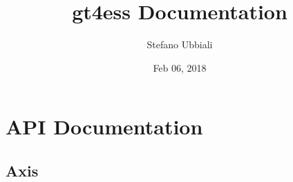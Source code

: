\documentclass[letterpaper,10pt,english]{sphinxmanual}
\title{gt4ess Documentation}
\date{Feb 06, 2018}
\author{Stefano Ubbiali}
\begin{document}
\maketitle
\sphinxtableofcontents
{}\label{\detokenize{index::doc}}



\chapter{API Documentation}
\label{\detokenize{api:welcome-to-gt4ess-s-documentation}}\label{\detokenize{api:api-documentation}}\label{\detokenize{api::doc}}

\section{Axis}
\label{\detokenize{api:axis}}
\end{document}
